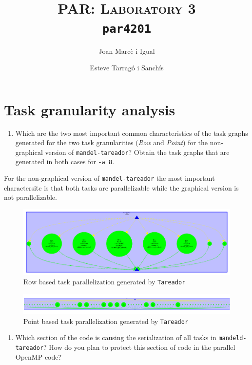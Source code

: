 \documentclass[a4paper]{article}
\title{
	\textsc{PAR: Laboratory 3} \\
	\texttt{\large par4201}
}
\author{Joan Marcè i Igual \and Esteve Tarragó i Sanchís}
\begin{document}
\maketitle
\tableofcontents
\pagebreak

\section{Task granularity analysis}

\begin{enumerate}
	\item Which are the two most important common characteristics of the task graphs generated for the two task granularities (\textit{Row} and \textit{Point}) for the non-graphical version of \texttt{mandel-tareador}? Obtain the task graphs that are generated in both cases for \texttt{-w 8}.
\end{enumerate}

For the non-graphical version of \verb|mandel-tareador| the most important charactersitc is that both tasks are parallelizable while the graphical version is not parallelizable. 

\begin{figure}[H]
	\centering
	\includegraphics[width=\textwidth]{images/depend_row_text.pdf}
	\caption{Row based task parallelization generated by \texttt{Tareador}}
\end{figure}
\begin{figure}[H]
	\centering
	\includegraphics[width=\textwidth]{images/depend_point_text.pdf}
	\caption{Point based task parallelization generated by \texttt{Tareador}}
\end{figure}

\begin{enumerate}[resume]
	\item Which section of the code is causing the serialization of all tasks in \texttt{mandeld-tareador}? How do you plan to protect this section of code in the parallel OpenMP code?
\end{enumerate}
\end{document}
